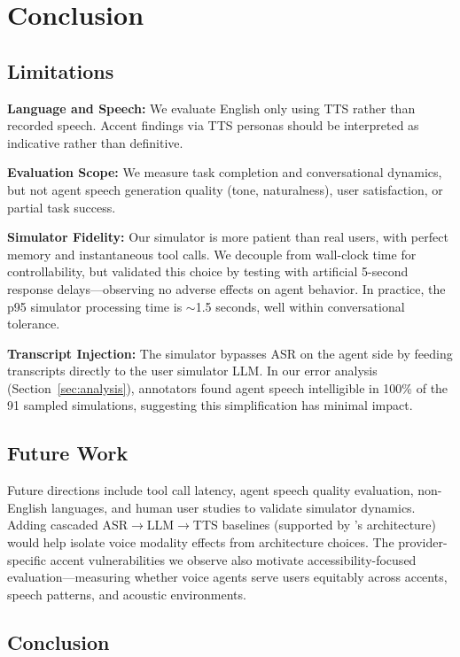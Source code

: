 \section{Conclusion}
\label{sec:conclusion}

\subsection{Limitations}

\textbf{Language and Speech:} We evaluate English only using TTS rather than recorded speech. Accent findings via TTS personas should be interpreted as indicative rather than definitive.

\textbf{Evaluation Scope:} We measure task completion and conversational dynamics, but not agent speech generation quality (tone, naturalness), user satisfaction, or partial task success.

\textbf{Simulator Fidelity:} Our simulator is more patient than real users, with perfect memory and instantaneous tool calls. We decouple from wall-clock time for controllability, but validated this choice by testing with artificial 5-second response delays---observing no adverse effects on agent behavior. In practice, the p95 simulator processing time is $\sim$1.5 seconds, well within conversational tolerance.

\textbf{Transcript Injection:} The simulator bypasses ASR on the agent side by feeding transcripts directly to the user simulator LLM. In our error analysis (Section~\ref{sec:analysis}), annotators found agent speech intelligible in 100\% of the 91 sampled simulations, suggesting this simplification has minimal impact.

\subsection{Future Work}

Future directions include tool call latency, agent speech quality evaluation, non-English languages, and human user studies to validate simulator dynamics. Adding cascaded ASR$\rightarrow$LLM$\rightarrow$TTS baselines (supported by \tauvoice{}'s architecture) would help isolate voice modality effects from architecture choices. The provider-specific accent vulnerabilities we observe also motivate accessibility-focused evaluation---measuring whether voice agents serve users equitably across accents, speech patterns, and acoustic environments.

\subsection{Conclusion}


